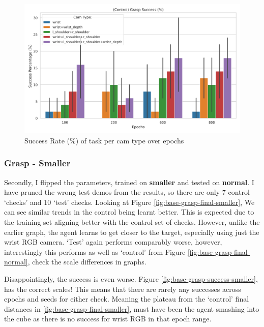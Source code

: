 \begin{figure}[htpb]
  \centering
  \includegraphics[scale = 0.3]{assets/evaluation/baseline/base-grasp-control-success-cams-epochs.png}
  \caption{Success Rate (\%) of task per cam type over epochs}\label{fig:base-grasp-control-success-normal}
\end{figure}

\subsubsection{Grasp - Smaller}
Secondly, I flipped the parameters, trained on \textbf{smaller} and tested on \textbf{normal}. I have pruned the wrong test demos from the results, so there are only $7$ control `checks' and $10$ `test' checks. Looking at Figure \ref{fig:base-grasp-final-smaller}, We can see similar trends in the control being learnt better. This is expected due to the training set aligning better with the control set of checks. However, unlike the earlier graph, the agent learns to get closer to the target, especially using just the wrist RGB camera. `Test' again performs comparably worse, however, interestingly this performs as well as `control' from Figure \ref{fig:base-grasp-final-normal}, check the scale differences in graphs. 

Disappointingly, the success is even worse. Figure \ref{fig:base-grasp-success-smaller}, has the correct scales! This means that there are rarely any successes across epochs and seeds for either check. Meaning the plateau from the `control' final distances in \ref{fig:base-grasp-final-smaller}, must have been the agent smashing into the cube as there is no success for wrist RGB in that epoch range. 

